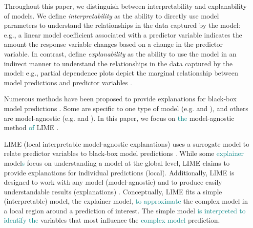 \documentclass[AMS,STIX2COL]{WileyNJD-v2}\usepackage[]{graphicx}\usepackage[]{color}
\newcommand{\kge}[1]{\textcolor{teal}{#1}}
\renewcommand{\sout}[1]{\unskip}
\begin{document}
Throughout this paper, we distinguish between interpretability and explanability of models. We define {\it interpretability} as the ability to directly use model parameters to understand the relationships in the data captured by the model: e.g., a linear model coefficient associated with a predictor variable indicates the amount the response variable changes based on a change in the predictor variable. In contrast, define {\it explanability} as the ability to use the model in an indirect manner to understand the relationships in the data captured by the model: e.g., partial dependence plots depict the marginal relationship between model predictions and predictor variables \citep{friedman:2001}.

Numerous methods have been proposed to provide explanations for black-box model predictions \citep{gilpin:2018, guidotti:2018, ming:2017, molnar:2019}. Some are specific to one type of model (e.g. \citep{simonyan:2013} and \citep{urbanek:2008}), and others are model-agnostic (e.g. \citep{fisher:2018} and \citep{strumbelj:2014}). In this paper, we focus on \kge{the} \sout{one specific} model-agnostic method\sout{:} \kge{of} LIME \citep{ribeiro:2016}.

LIME (local interpretable model-agnostic explanations) \sout{is a method that} uses a surrogate model to relate predictor variables to black-box model predictions \sout{(i.e. a model explainer)} \citep{ribeiro:2016}. \sout{We distinguish between the terms of model explainer and explainer model: by \emph{model explainer} we denote the method for explaining a complex model using a surrogate model, while the \emph{explainer model}, or simply the \emph{explainer}, is the surrogate model.} While some \kge{explainer} model\kge{s} \sout{explainers} focus on understanding a model at the global level, LIME claims to provide explanations for individual predictions (local). Additionally, LIME is designed to work with any model (model-agnostic) and to produce easily understandable results (explanations) \citep{ribeiro:2016}. Conceptually, LIME fits a simple (interpretable) model, the explainer model, \kge{to approximate} \sout{meant to capture the behavior of} the \sout{(}complex\sout{) black-box} model in a local region around a prediction of interest. The simple model \kge{is interpreted to identify the} \sout{then provides interpretable estimates for} variables that most influence\sout{d} the \kge{complex model} prediction\sout{made by the complex model}.
\end{document}
